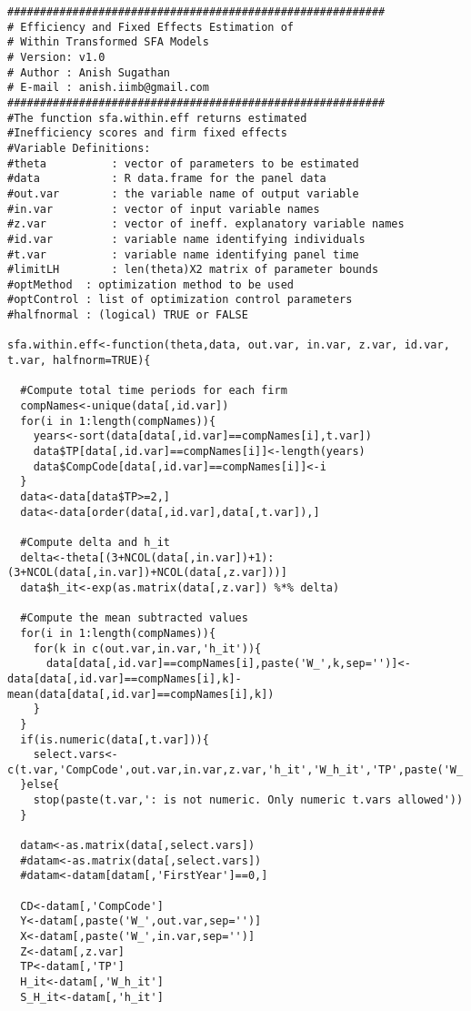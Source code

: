 \begin{lstlisting}[label=Rcode2, caption=R-Code for Efficiency and Fixed Effects Estimation]   
##########################################################
# Efficiency and Fixed Effects Estimation of
# Within Transformed SFA Models
# Version: v1.0
# Author : Anish Sugathan
# E-mail : anish.iimb@gmail.com 
########################################################## 
#The function sfa.within.eff returns estimated
#Inefficiency scores and firm fixed effects
#Variable Definitions:
#theta   		: vector of parameters to be estimated
#data    		: R data.frame for the panel data 
#out.var 		: the variable name of output variable
#in.var  		: vector of input variable names
#z.var   		: vector of ineff. explanatory variable names
#id.var  		: variable name identifying individuals
#t.var	 		: variable name identifying panel time
#limitLH 		: len(theta)X2 matrix of parameter bounds
#optMethod	: optimization method to be used
#optControl	: list of optimization control parameters
#halfnormal	: (logical) TRUE or FALSE     

sfa.within.eff<-function(theta,data, out.var, in.var, z.var, id.var, t.var, halfnorm=TRUE){
  
  #Compute total time periods for each firm
  compNames<-unique(data[,id.var])
  for(i in 1:length(compNames)){
    years<-sort(data[data[,id.var]==compNames[i],t.var])
    data$TP[data[,id.var]==compNames[i]]<-length(years)  
    data$CompCode[data[,id.var]==compNames[i]]<-i
  }  
  data<-data[data$TP>=2,]
  data<-data[order(data[,id.var],data[,t.var]),]
  
  #Compute delta and h_it
  delta<-theta[(3+NCOL(data[,in.var])+1):(3+NCOL(data[,in.var])+NCOL(data[,z.var]))]
  data$h_it<-exp(as.matrix(data[,z.var]) %*% delta)  
  
  #Compute the mean subtracted values  
  for(i in 1:length(compNames)){    
    for(k in c(out.var,in.var,'h_it')){
      data[data[,id.var]==compNames[i],paste('W_',k,sep='')]<-data[data[,id.var]==compNames[i],k]-mean(data[data[,id.var]==compNames[i],k])
    }    
  }
  if(is.numeric(data[,t.var])){
    select.vars<-c(t.var,'CompCode',out.var,in.var,z.var,'h_it','W_h_it','TP',paste('W_',out.var,sep=''),paste('W_',in.var,sep=''))
  }else{
    stop(paste(t.var,': is not numeric. Only numeric t.vars allowed'))
  }
  
  datam<-as.matrix(data[,select.vars])
  #datam<-as.matrix(data[,select.vars])
  #datam<-datam[datam[,'FirstYear']==0,]
  
  CD<-datam[,'CompCode']
  Y<-datam[,paste('W_',out.var,sep='')]  
  X<-datam[,paste('W_',in.var,sep='')]
  Z<-datam[,z.var]
  TP<-datam[,'TP']
  H_it<-datam[,'W_h_it']
  S_H_it<-datam[,'h_it']  


\end{lstlisting}
